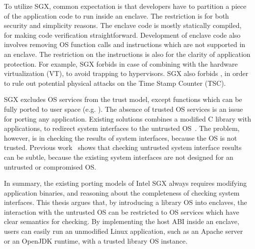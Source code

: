 To utilize SGX, common expectation is that developers have to partition a piece of the application code to run inside an enclave.
The restriction is for both security and simplicity reasons.
The enclave code is mostly statically compiled, for making code verification straightforward.
Development of enclave code also involves removing OS function calls and instructions which are not supported in an enclave.
The restriction on the instructions is also for the clarity of application protection.
For example,
SGX forbids  in case of combining with the hardware virtualization (VT),
to avoid trapping to hypervisors.
SGX also forbids , in order to rule out potential physical attacks on the Time Stamp Counter (TSC). 


SGX excludes OS services from the trust model, except functions which can be fully ported to user space (e.g. ).
The absence of trusted OS services is an issue for porting any application.
Existing solutions combines a modified C library with applications, to redirect system interfaces
to the untrusted OS~\cite{osdi16scone,shinde17panoply}.
The problem, however, is in checking the results of system interfaces, because the OS is not trusted. %
Previous work~\cite{checkoway13iago} shows that
checking untrusted system interface results can be subtle, because the existing system interfaces are not designed for an untrusted or compromised OS.


In summary, the existing porting models of Intel SGX always requires modifying application binaries, and reasoning about the completeness of checking system interfaces.
This thesis argues that, by introducing a library OS into enclaves,
the interaction with the untrusted OS can be restricted to OS services which have clear semantics for checking.
By implementing the host ABI inside an enclave,
users can easily run an unmodified Linux application, such as an Apache server or an OpenJDK runtime,
with a trusted \graphene{} library OS instance.



